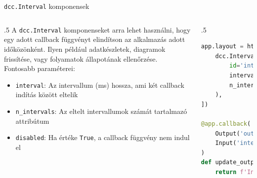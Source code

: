 \documentclass[english, aspectratio=169]{beamer}
\begin{document}
\begin{frame}[fragile]{\texttt{dcc.Interval} komponensek}
	\begin{columns}
		\begin{column}{.5\textwidth}
			A \texttt{dcc.Interval} komponenseket arra lehet használni, hogy egy adott callback függvényt elindítson az alkalmazás adott időközönként. Ilyen például adatkészletek, diagramok frissítése, vagy folyamatok állapotának ellenőrzése. Fontosabb paraméterei:
			\begin{itemize}
				\item \texttt{interval}: Az intervallum (ms) hossza, ami két callback indítás között eltelik
				\item \texttt{n\_intervals}: Az eltelt intervallumok számát tartalmazó attribútum
				\item \texttt{disabled}: Ha értéke \texttt{True}, a callback függvény nem indul el
			\end{itemize}
		\end{column}
		\begin{column}{.5\textwidth}
			\begin{lstlisting}[language=python]
app.layout = html.Div([
	dcc.Interval(
		id='interval-component', 
		interval=1 * 1000,
		n_intervals=0,
	),
])

@app.callback(
	Output('output', 'children'),
	Input('interval-component', 'n_intervals')
)
def update_output(n):
	return f'Interval has triggered {n} times.'				
			\end{lstlisting}
		\end{column}
	\end{columns}
\end{frame}
\end{document}
